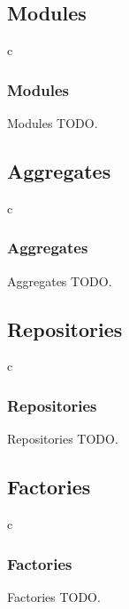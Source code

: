 \documentclass[a4paper,slidestop,xcolor=pst,dvips,blue]{beamer}
\begin{document}
\subsection{Modules}

\begin{frame}{c}
    \frametitle{Modules}
    \begin{block}{Modules}
    TODO.
    \end{block}
\end{frame}

\subsection{Aggregates}

\begin{frame}{c}
    \frametitle{Aggregates}
    \begin{block}{Aggregates}
    TODO.
    \end{block}
\end{frame}

\subsection{Repositories}

\begin{frame}{c}
    \frametitle{Repositories}
    \begin{block}{Repositories}
    TODO.
    \end{block}
\end{frame}

\subsection{Factories}

\begin{frame}{c}
    \frametitle{Factories}
    \begin{block}{Factories}
    TODO.
    \end{block}
\end{frame}

%

%
%	
%    
\end{document}
